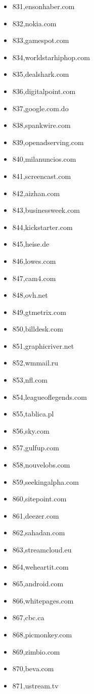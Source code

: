 \begin{multicols}{3}
\begin{itemize}
	\item 831,ensonhaber.com
	\item 832,nokia.com
	\item 833,gamespot.com
	\item 834,worldstarhiphop.com
	\item 835,dealshark.com
	\item 836,digitalpoint.com
	\item 837,google.com.do
	\item 838,spankwire.com
	\item 839,openadserving.com
	\item 840,milanuncios.com
	\item 841,screencast.com
	\item 842,aizhan.com
	\item 843,businessweek.com
	\item 844,kickstarter.com
	\item 845,heise.de
	\item 846,lowes.com
	\item 847,cam4.com
	\item 848,ovh.net
	\item 849,gtmetrix.com
	\item 850,billdesk.com
	\item 851,graphicriver.net
	\item 852,wmmail.ru
	\item 853,nfl.com
	\item 854,leagueoflegends.com
	\item 855,tablica.pl
	\item 856,sky.com
	\item 857,gulfup.com
	\item 858,nouvelobs.com
	\item 859,seekingalpha.com
	\item 860,sitepoint.com
	\item 861,deezer.com
	\item 862,sahadan.com
	\item 863,streamcloud.eu
	\item 864,weheartit.com
	\item 865,android.com
	\item 866,whitepages.com
	\item 867,cbc.ca
	\item 868,picmonkey.com
	\item 869,zimbio.com
	\item 870,beva.com
	\item 871,ustream.tv

\end{itemize}
\end{multicols}
